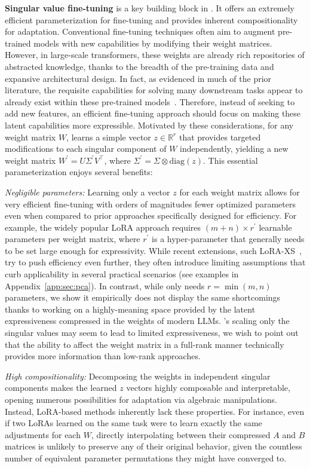 \textbf{Singular value fine-tuning}\label{sec:svf} is a key building block in \implname.
It offers an extremely efficient parameterization for fine-tuning and provides inherent compositionality for adaptation.
Conventional fine-tuning techniques often aim to augment pre-trained models with new capabilities by modifying their weight matrices.
However, in large-scale transformers,  these weights are already rich repositories of abstracted knowledge, thanks to the breadth of the pre-training data and expansive architectural design.
In fact, as evidenced in much of the prior literature, the requisite capabilities for solving many downstream tasks appear to already exist within these pre-trained models~\citep{sharma2023truth}.
Therefore, instead of seeking to add new features, an efficient fine-tuning approach should focus on making these latent capabilities more expressible. Motivated by these considerations, for any weight matrix $W$, \svdacro learns a simple vector $z\in \mathbb{R}^r$ that provides targeted modifications to each singular component of  $W$ independently, yielding a new weight matrix $W^\prime=U \Sigma^\prime V^\intercal$, where $\Sigma^\prime=\Sigma \otimes\text{diag}(z)$.
This essential parameterization enjoys several benefits:

\textit{Negligible parameters:} Learning only a vector $z$ for each weight matrix allows for very efficient fine-tuning with orders of magnitudes fewer optimized parameters even when compared to prior approaches specifically designed for efficiency. 
For example, the widely popular LoRA approach requires $(m + n) \times r^\prime$ learnable parameters per weight matrix, where $r^\prime$ is a hyper-parameter that generally needs to be set large enough for expressivity. While recent extensions, such LoRA-XS~\citep{balazy2024lora}, try to push efficiency even further, they often introduce limiting assumptions that curb applicability in several practical scenarios (see examples in Appendix~\ref{app:sec:pca}). 
In contrast, while \svdacro only needs $r=\min(m, n)$ parameters, we show it empirically does not display the same shortcomings thanks to working on a highly-meaning space provided by the latent expressiveness compressed in the weights of modern LLMs.
\svdacro's scaling only the singular values may seem to lead to limited expressiveness, we wish to point out that the ability to affect the weight matrix in a full-rank manner technically provides more information than low-rank approaches.

\textit{High compositionality:} Decomposing the weights in independent singular components makes the learned $z$ vectors highly composable and interpretable, opening numerous possibilities for adaptation via algebraic manipulations.
Instead, LoRA-based methods inherently lack these properties. 
For instance, even if two LoRAs learned on the same task were to learn exactly the same adjustments for each $W$, directly interpolating between their compressed $A$ and $B$ matrices is unlikely to preserve any of their original behavior, given the countless number of equivalent parameter permutations they might have converged to.

